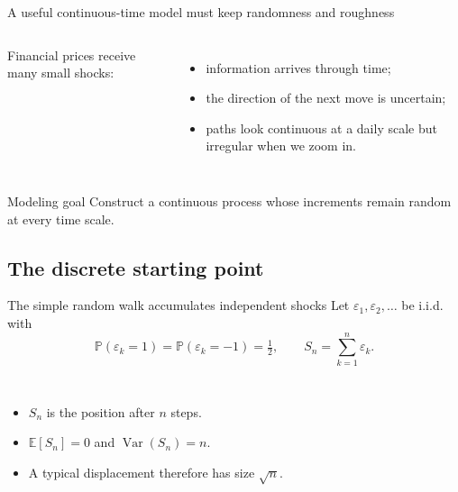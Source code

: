 \documentclass[handout,10pt,aspectratio=169]{beamer}
\newcommand{\E}{\mathbb E}
\newcommand{\Pp}{\mathbb P}
\begin{document}
\begin{frame}{A useful continuous-time model must keep randomness and roughness}
\begin{columns}[T,onlytextwidth]
Financial prices receive many small shocks:
\begin{itemize}
  \item information arrives through time;
  \item the direction of the next move is uncertain;
  \item paths look continuous at a daily scale but irregular when we zoom in.
\end{itemize}

\centering
{}
\end{columns}
\begin{block}{Modeling goal}
Construct a continuous process whose increments remain random at every time scale.
\end{block}
\end{frame}

\subsection{The discrete starting point}

\begin{frame}{The simple random walk accumulates independent shocks}
Let \(\varepsilon_1,\varepsilon_2,\ldots\) be i.i.d. with
\[
\Pp(\varepsilon_k=1)=\Pp(\varepsilon_k=-1)=\tfrac12,
\qquad
S_n=\sum_{k=1}^{n}\varepsilon_k.
\]
\begin{columns}[T,onlytextwidth]
\begin{itemize}
  \item \(S_n\) is the position after \(n\) steps.
  \item \(\E[S_n]=0\) and \(\operatorname{Var}(S_n)=n\).
  \item A typical displacement therefore has size \(\sqrt n\).
\end{itemize}
\centering
{}
\end{columns}
\end{frame}
\end{document}
